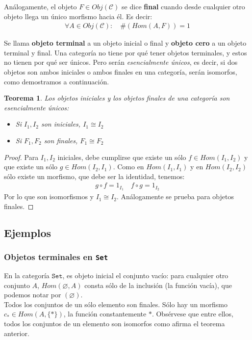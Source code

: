 \documentclass[a4paper, 11pt]{amsart}
\let\emptyset\varnothing
\newcommand{\C}{\mathcal{C} }
\newtheorem{theorem}{Teorema}[section]
\theoremstyle{definition}
\theoremstyle{remark}
\numberwithin{equation}{section}
\begin{document}
     Análogamente, el objeto $F \in Obj(\C)$ se dice \textbf{final} cuando desde cualquier otro objeto llega
    un único morfismo hacia él. Es decir:
    \begin{gather*}
      \forall A \in Obj(\C):\quad \#(Hom(A,F)) = 1
    \end{gather*}
    
    Se llama \textbf{objeto terminal} a un objeto inicial o final y \textbf{objeto cero} a un objeto
    terminal y final. Una categoría no tiene por qué
    tener objetos terminales, y estos no tienen por qué ser únicos. Pero serán \textit{esencialmente únicos},
    es decir, si dos objetos son ambos iniciales o ambos finales en una categoría, serán isomorfos,
    como demostramos a continuación.
    
    \begin{theorem} Los objetos iniciales y los objetos finales de una
    categoría son esencialmente únicos:
      \begin{itemize}
	\item Si $I_1,I_2$ son iniciales, $I_1 \cong I_2$
	\item Si $F_1,F_2$ son finales, $F_1 \cong F_2$
      \end{itemize}
    \end{theorem}

    \begin{proof}
      Para $I_1,I_2$ iniciales, debe cumplirse que existe un sólo $f \in Hom(I_1,I_2)$
      y que existe un sólo $g \in Hom(I_2,I_1)$. Como en $Hom(I_1,I_1)$ y en $Hom(I_2,I_2)$ sólo existe un morfismo,
      que debe ser la identidad, tenemos:
      \begin{gather*}
	g \circ f = 1_{I_1} \quad f \circ g = 1_{I_2}
      \end{gather*}
      Por lo que son isomorfismos y $I_1 \cong I_2$. Análogamente se prueba para objetos finales.
    \end{proof}
    
  \subsection {Ejemplos}
    \subsubsection {Objetos terminales en \texttt{Set}}
      En la categoría $\mathtt{Set}$, es objeto inicial el conjunto vacío: para cualquier otro
      conjunto $A$, $Hom(\emptyset, A)$ consta sólo de la inclusión (la función vacía), que 
      podemos notar por $(\emptyset)$. \\
      Todos los conjuntos de un sólo elemento son finales. Sólo hay un morfismo $c_\ast \in Hom(A,\{\ast\})$,
      la función constantemente $\ast$. Obsérvese que entre ellos, todos los conjuntos de un elemento
      son isomorfos como afirma el teorema anterior.
    
\end{document}
